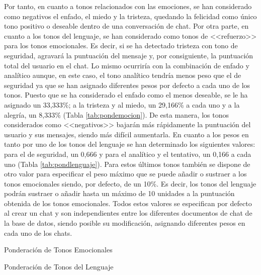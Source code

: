 \clearpage

Por tanto, en cuanto a tonos relacionados con las emociones, se han considerado como negativos el enfado, el miedo y la tristeza, quedando la felicidad como único tono positivo o deseable dentro de una conversación de chat. Por otra parte, en cuanto a los tonos del lenguaje, se han considerado como tonos de <<refuerzo>> para los tonos emocionales. Es decir, si se ha detectado tristeza con tono de seguridad, agravará la puntuación del mensaje y, por consiguiente, la puntuación total del usuario en el chat. Lo mismo ocurriría con la combinación de enfado y analítico aunque, en este caso, el tono analítico tendría menos peso que el de seguridad ya que se han asignado diferentes pesos por defecto a cada uno de los tonos. Puesto que se ha considerado el enfado como el menos deseable, se le ha asignado un 33,333\%; a la tristeza y al miedo, un 29,166\% a cada uno y a la alegría, un 8,333\% (Tabla \ref{tab:pondemocion}). De esta manera, los tonos considerados como <<negativos>> bajarán más rápidamente la puntuación del usuario y sus mensajes, siendo más difícil aumentarla. En cuanto a los pesos en tanto por uno de los tonos del lenguaje se han determinado los siguientes valores: para el de seguridad, un 0,666 y para el analítico y el tentativo, un 0,166 a cada uno (Tabla \ref{tab:pondlenguaje}). Para estos últimos tonos también se dispone de otro valor para especificar el peso máximo que se puede añadir o sustraer a los tonos emocionales siendo, por defecto, de un 10\%. Es decir, los tonos del lenguaje podrán sustraer o añadir hasta un máximo de 10 unidades a la puntuación obtenida de los tonos emocionales. Todos estos valores se especifican por defecto al crear un chat y son independientes entre los diferentes documentos de chat de la base de datos, siendo posible su modificación, asignando diferentes pesos en cada uno de los chats.

\begin{table}[!htbp]
	\centering
	{\small
		
	}
	\caption[Ponderación de Tonos Emocionales]
	{Ponderación de Tonos Emocionales}
	\label{tab:pondemocion}
\end{table}

\begin{table}[!htbp]
	\centering
	{\small
		
	}
	\caption[Ponderación de Tonos del Lenguaje]
	{Ponderación de Tonos del Lenguaje}
	\label{tab:pondlenguaje}
\end{table}

\clearpage

